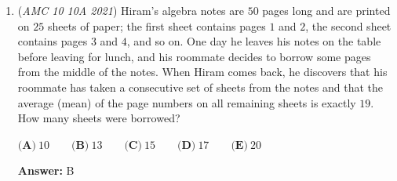 \begin{enumerate}
\textbf{Solution 2}

Let the length $AB=x, BC=y.$ Then, we have
 \begin{align*} (y+2x)^2\cdot\frac{\sqrt 3}{4}&=324\sqrt3, \\ (x+2y)^2\cdot\frac{\sqrt 3}{4}&=192\sqrt3. \end{align*}
We get
 \begin{align*} y+2x&=36, \\ x+2y&=16\sqrt3. \end{align*}
We want $3x+3y,$ and it follows that 
 \[3x+3y=(y+2x)+(x+2y)=36+16\sqrt3.\]Finally, the answer is $36+16+3=\boxed{\textbf{(C)} ~55}.$

 Note: This solution is kind of a fakesolve because it assumes the hexagon is rotationally symmetric, which we can see it is not by the diagram in Solution 1.

 



\textbf{Solution 3 (Solution 1 But More Condensed)}

Since it is an equiangular hexagon, each interior angle measures $120$ degrees, and by angle chasing you can conclude that all the triangles are equilateral. Since the area formula for an equiangular triangle is $s^2 \frac{\sqrt3}{4}$, the side lengths of the triangles are $36$ and $16 \sqrt{3}$. In the above diagram the sum of the lengths of $AF$, $AB$, and $FE$ is $36$ and the sum of the lengths of $BC$, $CD$, and $DE$ is $16\sqrt{3}$. Since these are also the side lengths of the hexagon, the answer is $36+16+3=55  (C)$.

 


	\item (\textit{AMC 10 10A 2021}) Hiram's algebra notes are $50$ pages long and are printed on $25$ sheets of paper; the first sheet contains pages $1$ and $2$, the second sheet contains pages $3$ and $4$, and so on. One day he leaves his notes on the table before leaving for lunch, and his roommate decides to borrow some pages from the middle of the notes. When Hiram comes back, he discovers that his roommate has taken a consecutive set of sheets from the notes and that the average (mean) of the page numbers on all remaining sheets is exactly $19$. How many sheets were borrowed?


 $\textbf{(A)} ~10\qquad\textbf{(B)} ~13\qquad\textbf{(C)} ~15\qquad\textbf{(D)} ~17\qquad\textbf{(E)} ~20$

 \textbf{Answer: }B




\end{enumerate}
